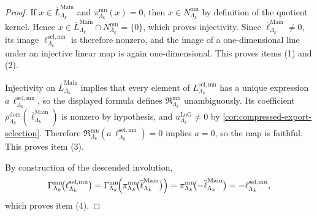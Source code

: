 \documentclass[11pt]{article}
\begin{document}
\begin{proof}
If
\(
x\in \overline L^{\mathrm{Main}}_{\Lambda_k}
\)
and
\(
\pi^{\mathrm{mn}}_{\Lambda_k}(x)=0
\),
then
\(
x\in N^{\mathrm{mn}}_{\Lambda_k}
\)
by definition of the quotient kernel.
Hence
\(
x\in
\overline L^{\mathrm{Main}}_{\Lambda_k}\cap N^{\mathrm{mn}}_{\Lambda_k}
=
\{0\}
\),
which proves injectivity.
Since
\(
\overline\ell^{\mathrm{Main}}_{\Lambda_k}\neq 0
\),
its image
\(
\ell^{\mathrm{sel,mn}}_{\Lambda_k}
\)
is therefore nonzero, and the image of a one-dimensional line under an injective linear map is
again one-dimensional.
This proves items \textnormal{(1)} and \textnormal{(2)}.

Injectivity on
\(
\overline L^{\mathrm{Main}}_{\Lambda_k}
\)
implies that every element of
\(
L^{\mathrm{sel,mn}}_{\Lambda_k}
\)
has a unique expression
\(
a\,\ell^{\mathrm{sel,mn}}_{\Lambda_k}
\),
so the displayed formula defines
\(
\mathfrak R^{\mathrm{mn}}_{\Lambda_k}
\)
unambiguously.
Its coefficient
\(
\overline{\rho}^{\mathrm{dom}}_{\Lambda_k}
(\overline\ell^{\mathrm{Main}}_{\Lambda_k})
\)
is nonzero by hypothesis, and
\(
u^{\mathrm{LoG}}_{\Lambda_k}\neq 0
\)
by \cref{cor:compressed-export-selection}.
Therefore
\(
\mathfrak R^{\mathrm{mn}}_{\Lambda_k}
(a\,\ell^{\mathrm{sel,mn}}_{\Lambda_k})
=
0
\)
implies
\(
a=0
\),
so the map is faithful.
This proves item \textnormal{(3)}.

By construction of the descended involution,
\[
\Gamma^{\mathrm{mn}}_{\Lambda_k}
\!\bigl(
\ell^{\mathrm{sel,mn}}_{\Lambda_k}
\bigr)
=
\Gamma^{\mathrm{mn}}_{\Lambda_k}
\!\Bigl(
\pi^{\mathrm{mn}}_{\Lambda_k}
\!\bigl(
\overline\ell^{\mathrm{Main}}_{\Lambda_k}
\bigr)
\Bigr)
=
\pi^{\mathrm{mn}}_{\Lambda_k}
\!\bigl(
-\overline\ell^{\mathrm{Main}}_{\Lambda_k}
\bigr)
=
-\ell^{\mathrm{sel,mn}}_{\Lambda_k},
\]
which proves item \textnormal{(4)}.
\end{proof}
\end{document}
